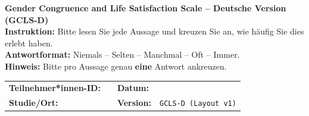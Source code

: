 \documentclass[11pt,a4paper]{article}
\begin{document}
\begin{tcolorbox}[
  colback=GCLSGray,
  colframe=GCLSBlue,
  arc=2mm,
  boxrule=0.8pt,
  left=4mm,right=4mm,top=3mm,bottom=3mm
]
{\Large \textbf{Gender Congruence and Life Satisfaction Scale – Deutsche Version (GCLS-D)}}\\
\textbf{Instruktion:} Bitte lesen Sie jede Aussage und kreuzen Sie an, wie häufig Sie dies erlebt haben.\\
\textbf{Antwortformat:} Niemals – Selten – Manchmal – Oft – Immer.\\
\textbf{Hinweis:} Bitte pro Aussage genau \textbf{eine} Antwort ankreuzen.
\end{tcolorbox}

\vspace{2mm}

\begin{tabular}{@{}p{}p{}p{}p{}@{}}
\textbf{Teilnehmer*innen-ID:} & \hrulefill & \textbf{Datum:} & \hrulefill \\
\textbf{Studie/Ort:} & \hrulefill & \textbf{Version:} & \texttt{GCLS-D (Layout v1)} \\
\end{tabular}

\vspace{4mm}
\end{document}
